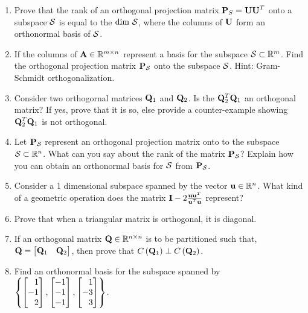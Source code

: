 \documentclass[12pt]{article}
\def\mf{\ensuremath\mathbf}
\def\mb{\ensuremath\mathbb}
\def\mc{\ensuremath\mathcal}
\def\lp{\ensuremath\left(}
\def\rp{\ensuremath\right)}
\def\lc{\ensuremath\left\{}
\def\rc{\ensuremath\right\}}
\def\bmx{\ensuremath\begin{bmatrix*}[r]}
\def\emx{\ensuremath\end{bmatrix*}}
\begin{document}
\begin{enumerate}
  \item Prove that the rank of an orthogonal projection matrix $\mf{P}_{S} = \mf{UU}^T$ onto a subspace $\mc{S}$ is equal to the $\text{dim } \mc{S}$, where the columns of $\mf{U}$ form an orthonormal basis of $\mc{S}$.

  \item If the columns of $\mf{A} \in \mb{R}^{m \times n}$ represent a basis for the subspace $\mc{S} \subset \mb{R}^m$. Find the orthogonal projection matrix $\mf{P}_\mc{S}$ onto the subspace $\mc{S}$. Hint: Gram-Schmidt orthogonalization.

  \item Consider two orthogornal matrices $\mf{Q}_1$ and $\mf{Q}_2$. Is the $\mf{Q}_2^T\mf{Q}_1$ an orthogonal matrix? If yes, prove that it is so, else provide a counter-example showing $\mf{Q}_2^T\mf{Q}_1$ is not orthogonal.

  \item Let $\mf{P}_\mc{S}$ represent an orthogonal projection matrix onto to the subspace $\mc{S} \subset \mb{R}^n$. What can you say about the rank of the matrix $\mf{P}_\mc{S}$? Explain how you can obtain an orthonormal basis for $\mc{S}$ from $\mf{P}_\mc{S}$.

  \item Consider a 1 dimensional subspace spanned by the vector $\mf{u} \in \mb{R}^n$. What kind of a geometric operation does the matrix $\mf{I} - 2\frac{\mf{u}\mf{u}^T}{\mf{u}^T\mf{u}}$ represent?

  \item Prove that when a triangular matrix is orthogonal, it is diagonal.

  \item If an orthogonal matrix $\mf{Q} \in \mb{R}^{n \times n}$ is to be partitioned such that, $\mf{Q} = \bmx \mf{Q}_1 & \mf{Q}_2\emx$, then prove that $C\lp\mf{Q}_1\rp \perp C\lp\mf{Q}_2\rp$.

  \item Find an orthonormal basis for the subspace spanned by $\lc \bmx1\\-1\\2\emx, \bmx-1\\-1\\-1\emx, \bmx1\\-3\\3\emx \rc$.

\end{enumerate}
\end{document}
